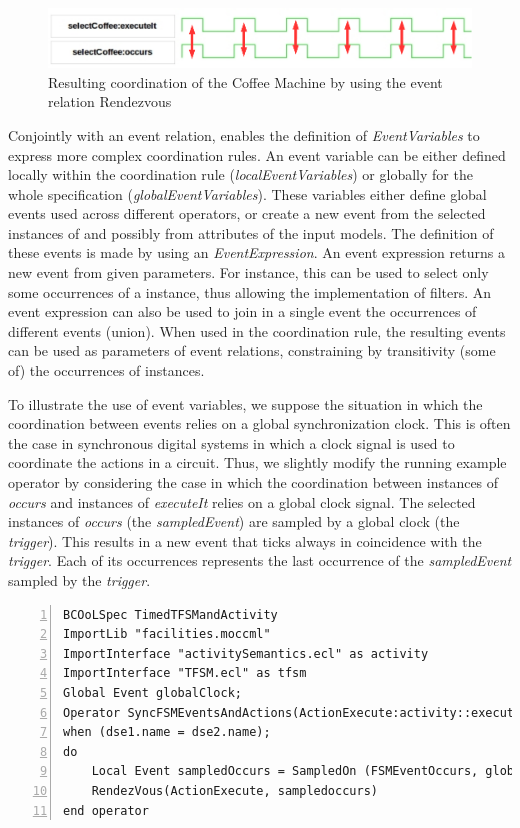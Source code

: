 	\begin{figure}[h]
		\center
		\includegraphics[width=.8\textwidth]{bcool/figs/runningrdv}
		\caption{Resulting coordination of the Coffee Machine by using the event relation Rendezvous}
		\label{fig:runningrdv}
	\end{figure}


Conjointly with an event relation, \bcool enables the definition of \emph{EventVariables} to express more complex coordination rules. An event variable can be either defined locally within the coordination rule (\emph{localEventVariables}) or globally for the whole specification (\emph{globalEventVariables}). These variables either define global events used across different operators, or create a new event from the selected instances of \dse and possibly from attributes of the input models. The definition of these events is made by using an \emph{EventExpression}. An event expression returns a new event from given parameters. For instance, this can be used to select only some occurrences of a \dse instance, thus allowing the implementation of filters. An event expression can also be used to join in a single event the occurrences of different events (union). When used in the coordination rule, the resulting events can be used as parameters of event relations, constraining by transitivity (some of) the occurrences of \dse instances.

To illustrate the use of event variables, we suppose the situation in which the coordination between events relies on a global synchronization clock. This is often the case in synchronous digital systems in which a clock signal is used to coordinate the actions in a circuit. Thus, we slightly modify the running example operator by considering the case in which the coordination between instances of \dse \emph{occurs} and instances of \dse \emph{executeIt} relies on a global clock signal. The selected instances of \dse \emph{occurs} (the \emph{sampledEvent}) are sampled by a global clock (the \emph{trigger}). This results in a new event that ticks always in coincidence with the \emph{trigger}. Each of its occurrences represents the last occurrence of the \emph{sampledEvent} sampled by the \emph{trigger}. 
	
\begin{lstlisting}[language=bcool,
caption={\bcool specification of an operator that illustrates the use of Event Variables},
label={lst:bcoolrunningexampletimed}, 
basicstyle=\scriptsize\ttfamily, backgroundcolor=\color{LGrey}, numbers=left, xleftmargin=2pt]
BCOoLSpec TimedTFSMandActivity
ImportLib "facilities.moccml"
ImportInterface "activitySemantics.ecl" as activity
ImportInterface "TFSM.ecl" as tfsm
Global Event globalClock;
Operator SyncFSMEventsAndActions(ActionExecute:activity::executeIt, FSMEventOccurs:tfsm::occurs)
when (dse1.name = dse2.name);
do
	Local Event sampledOccurs = SampledOn (FSMEventOccurs, globalClock);
	RendezVous(ActionExecute, sampledoccurs)
end operator
\end{lstlisting}
			
